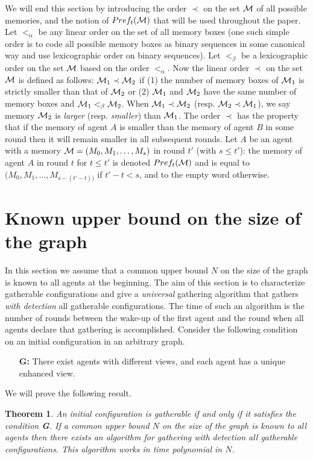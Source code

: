 \documentclass[11pt]{article}
\newtheorem{theorem}{Theorem}[section]
\newcommand{\cM}{{\cal M}}
\begin{document}
 {We will end this section by introducing the order $\prec$ on the set $\cM$ of all possible memories, and the notion of $Pref_t(\cM)$ that will be used throughout the paper. Let $<_\alpha$ be any linear order on the set of all memory boxes (one such simple order is to code all possible memory boxes as binary sequences in some canonical way and use lexicographic order on binary sequences). Let $<_\beta$ be a lexicographic order on the set $\cM$ based on the order $<_\alpha$. Now the linear order $\prec$ on the set $\cM$ is defined as follows: $\cM_1 \prec \cM_2$ if (1) the number of memory boxes of $\cM_1$ is strictly smaller than that of $\cM_2$ or (2) $\cM_1$ and $\cM_2$ have the same number of memory boxes and $\cM_1 <_\beta \cM_2$. When $\cM_1 \prec \cM_2$ (resp. $\cM_2 \prec \cM_1$), we say memory $\cM_2$ is {\em larger} (resp. {\em smaller}) than $\cM_1$. The order $\prec$ has the property that if the memory of agent $A$ is smaller than the memory of agent $B$ in some round then it will remain smaller in all subsequent rounds. Let $A$ be an agent with a memory $\cM=(M_0,M_1,\dots ,M_s)$ in round $t'$ (with $s\leq t'$): the memory of agent $A$ in round $t$ for $t\leq t'$ is denoted $Pref_t(\cM)$ and is equal to $(M_0,M_1,\dots ,M_{s-(t'-t))}$ if $t'-t<s$, and to the empty word otherwise.}




\section{Known upper bound on the size of the graph}

In this section we assume that a common upper bound $N$ on the size of the graph is known to all agents at the beginning.
The aim of this section is to characterize gatherable configurations and give a {\em universal} gathering algorithm that gathers {\em with detection} all gatherable configurations. The time of such an algorithm is the number of rounds between the wake-up of the first agent and the round when
all agents declare that gathering is accomplished.
Consider the following condition on an initial configuration in an arbitrary graph.
\begin{itemize}
\item
[{\bf G:}] There exist agents with different views, and each agent has a unique enhanced view.
\end{itemize}

We will prove the following result.

\begin{theorem}\label{eq}
An initial configuration is gatherable if and only if it satisfies the condition {\bf G}. If a common upper bound $N$ on the size of the graph is known to all agents then
there exists an algorithm for gathering with detection all gatherable configurations. This algorithm works in time polynomial in $N$.
\end{theorem}
\end{document}
